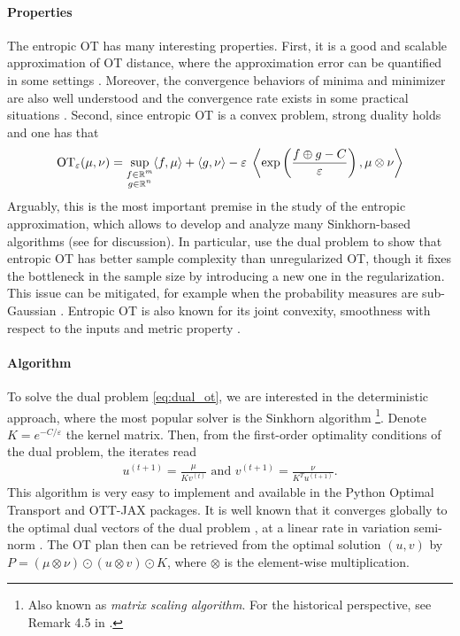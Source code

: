 \paragraph{Properties} The entropic OT has many interesting properties. First, it is a
good and scalable approximation of OT distance,
where the approximation error can be quantified in some settings \citep{Genevay19,Luise18}.
Moreover, the convergence behaviors of minima and minimizer are also well understood
\citep{Leonard12,Carlier17} and the convergence rate exists in some practical situations
\citep{Genevay19,Cominetti94,Weed18}.
Second, since entropic OT is a convex problem, strong duality holds and one has that
\begin{align}
  \label{eq:dual_ot}
  \text{OT}_{\varepsilon}(\mu, \nu) = \sup_{\substack{f \in \mathbb R^m \\ g \in \mathbb R^n}}
  \langle f, \mu \rangle + \langle g, \nu \rangle
  - \varepsilon \; \left\langle \exp \left( \frac{f \oplus g - C}{\varepsilon} \right), \mu \otimes \nu \right\rangle
\end{align}
Arguably, this is the most important premise in the study of the entropic approximation, which
allows to develop and analyze many Sinkhorn-based algorithms (see  for discussion).
In particular, \citep{Genevay19} use the dual problem to show that entropic OT
has better sample complexity than unregularized OT,
though it fixes the bottleneck in the sample size by introducing a new one in the regularization.
This issue can be mitigated, for example when the probability measures are sub-Gaussian \citep{Mena19}.
Entropic OT is also known for its joint convexity, smoothness with respect to
the inputs \citep{Luise18} and metric property \citep{Sanjabi18}.

\paragraph{Algorithm} To solve the dual problem \ref{eq:dual_ot},
we are interested in the deterministic approach, where the most popular solver
is the Sinkhorn algorithm \citep{Sinkhorn67}
\footnote{Also known as \textit{matrix scaling algorithm}.
For the historical perspective, see Remark 4.5 in \citep{Peyre19}.}.
Denote $K = e^{-C / \varepsilon}$ the kernel matrix. Then,
from the first-order optimality conditions of the dual problem, the iterates read
\begin{align}
  u^{(t+1)} = \frac{\mu}{Kv^{(t)}} \text{ and } v^{(t+1)} = \frac{\nu}{K^T u^{(t+1)}}.
\end{align}
This algorithm is very easy to implement and available in the Python Optimal Transport
\citep{Flamary21} and OTT-JAX \citep{Cuturi22} packages.
It is well known that it converges globally to the optimal dual vectors of the dual problem
\citep{Sinkhorn67}, at a linear rate in variation semi-norm \citep{Franklin89}.
The OT plan then can be retrieved from the optimal solution $(u, v)$ by
$P = (\mu \otimes \nu) \odot (u \otimes v) \odot K$,
where $\otimes$ is the element-wise multiplication.

